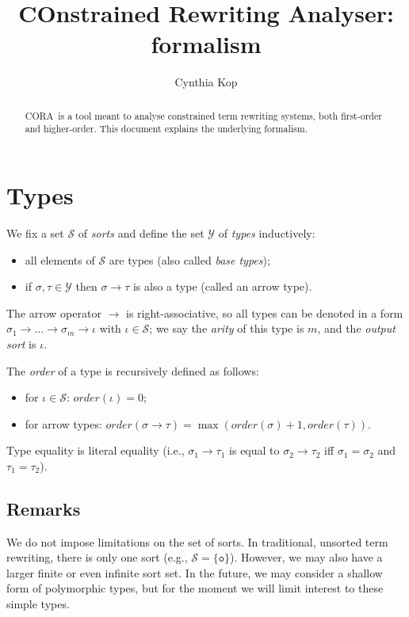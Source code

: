 \documentclass{lmcs}
\theoremstyle{theorem}\newtheorem{theorem}[dummy]{Theorem}
\theoremstyle{theorem}\newtheorem{lemma}[dummy]{Lemma}
\theoremstyle{theorem}\newtheorem{corollary}[dummy]{Corollary}
\theoremstyle{definition}\newtheorem{definition}[dummy]{Definition}
\theoremstyle{definition}\newtheorem{example}[dummy]{Example}
\newcommand{\Sorts}{\mathcal{S}}
\newcommand{\Types}{\mathcal{Y}}
\newcommand{\order}{\mathit{order}}
\newcommand{\asort}{\iota}
\newcommand{\atype}{\sigma}
\newcommand{\btype}{\tau}
\newcommand{\arrtype}{\rightarrow}
\newcommand{\unitsort}{\mathtt{o}}
\newcommand{\cora}{\textsf{CORA}\xspace}
\begin{document}
\title{COnstrained Rewriting Analyser: formalism}
\author{Cynthia Kop}
\address{Department of Software Science, Radboud University Nijmegen}

\maketitle

\begin{abstract}
\cora\ is a tool meant to analyse constrained term rewriting systems, both
first-order and higher-order.  This document explains the underlying formalism.
\end{abstract}

\section{Types}

We fix a set $\Sorts$ of \emph{sorts} and define the set $\Types$ of \emph{types} inductively:
\begin{itemize}
\item all elements of $\Sorts$ are types (also called \emph{base types});
\item if $\atype,\btype \in \Types$ then $\atype \arrtype \btype$ is also a type (called an arrow
  type).
\end{itemize}
The arrow operator $\arrtype$ is right-associative, so all types can be denoted in a form
$\atype_1 \arrtype \dots \arrtype \atype_m \arrtype \asort$ with $\asort \in \Sorts$; we say the
\emph{arity} of this type is $m$, and the \emph{output sort} is $\asort$.

The \emph{order} of a type is recursively defined as follows:
\begin{itemize}
\item for $\asort \in \Sorts$: $\order(\asort) = 0$;
\item for arrow types: $\order(\atype \arrtype \btype) = \max(\order(\atype) + 1,\order(\btype))$.
\end{itemize}

\bigskip
Type equality is literal equality (i.e., $\atype_1 \arrtype \btype_1$ is equal to $\atype_2 \arrtype
\btype_2$ iff $\atype_1 = \atype_2$ and $\btype_1 = \btype_2$).

\subsection*{Remarks}

We do not impose limitations on the set of sorts.  In traditional, unsorted term rewriting, there
is only one sort (e.g., $\Sorts = \{ \unitsort \}$). However, we may also have a larger finite or
even infinite sort set.
In the future, we may consider a shallow form of polymorphic types, but for the moment we will limit
interest to these simple types.
\end{document}
